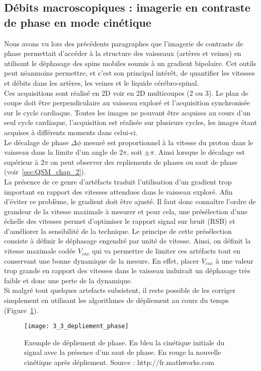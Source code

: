 \subsection{Débits macroscopiques : imagerie en contraste de phase en mode cinétique}
Nous avons vu lors des précédents paragraphes que l’imagerie de contraste de phase
permettait d’accéder à la structure des vaisseaux (artères et veines) en utilisant le déphasage des spins
mobiles soumis à un gradient bipolaire. Cet outils peut néanmoins permettre, et c’est son principal
intérêt, de quantifier les vitesses et débits dans les artères, les veines et le liquide cérébro-spinal.\\
Ces acquisitions sont réalisé en 2D voir en 2D multicoupes (2 ou 3). Le plan de coupe doit être
perpendiculaire au vaisseau exploré et l’acquisition synchronisée sur le cycle cardiaque. Toutes les
images ne pouvant être acquises au cours d’un seul cycle cardiaque, l’acquisition est réalisée sur
plusieurs cycles, les images étant acquises à différents moments dans celui-ci.\\
Le décalage de phase $\Delta \phi$ mesuré est proportionnel à la vitesse du proton dans le vaisseau dans
la limite d’un angle de 2$\pi$, soit $\pm \pi$. Ainsi lorsque le décalage est supérieur à 2$\pi$ on peut observer des
repliements de phases ou saut de phase (voir~\ref{sec:QSM_chap_2}).\\
La présence de ce genre d’artéfacts traduit l’utilisation d’un gradient trop important en rapport
des vitesses attendues dans le vaisseau exploré. Afin d’éviter ce problème, le gradient doit être ajusté.
Il faut donc connaître l’ordre de grandeur de la vitesse maximale à mesurer et pour cela, une
présélection d’une échelle des vitesses permet d’optimiser le rapport signal sur bruit (RSB) et
d’améliorer la sensibilité de la technique. Le principe de cette présélection consiste à définir le
déphasage engendré par unité de vitesse. Ainsi, on définit la vitesse maximale codée $V_{enc}$ qui va
permettre de limiter ces artéfacts tout en conservant une bonne dynamique de la mesure. En effet,
placer $V_{enc}$ à une valeur trop grande en rapport des vitesses dans le vaisseau induirait un déphasage
très faible et donc une perte de la dynamique.\\
Si malgré tout quelques artefacts subsistent, il reste possible de les corriger simplement en
utilisant les algorithmes de dépliement au cours du temps (Figure~\ref{fig:3_3_depliement_phase}).
\begin{figure}[!t]
\centering
\texttt{[image: 3\_3\_depliement\_phase]}
\caption{Exemple de dépliement de phase. En bleu la cinétique initiale du signal avec la présence d'un saut de
phase. En rouge la nouvelle cinétique après dépliement. Source : http://fr.mathworks.com}
\label{fig:3_3_depliement_phase}	
\end{figure}
